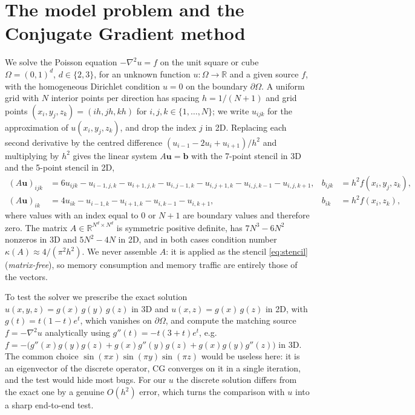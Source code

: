 \documentclass[10pt,a4paper]{article}
\newcommand{\vb}[1]{\mathbf{#1}}
\begin{document}
\section{The model problem and the Conjugate Gradient method}\label{sec:algorithm}

We solve the Poisson equation $-\nabla^2 u = f$ on the unit square or cube $\Omega=(0,1)^d$, $d\in\{2,3\}$,
for an unknown function $u:\Omega\to\mathbb{R}$ and a given source $f$, with the homogeneous Dirichlet
condition $u=0$ on the boundary $\partial\Omega$. A uniform grid with $N$ interior points per direction has
spacing $h=1/(N+1)$ and grid points $(x_i,y_j,z_k)=(ih,jh,kh)$ for $i,j,k\in\{1,\dots,N\}$; we write
$u_{ijk}$ for the approximation of $u(x_i,y_j,z_k)$, and drop the index $j$ in 2D. Replacing each second
derivative by the centred difference $(u_{i-1}-2u_i+u_{i+1})/h^2$ and multiplying by $h^2$ gives the linear
system $A\vb u=\vb b$ with the 7-point stencil in 3D and the 5-point stencil in 2D,
\begin{equation}\label{eq:stencil}
\begin{aligned}
  (A\vb u)_{ijk} &= 6u_{ijk}-u_{i-1,j,k}-u_{i+1,j,k}-u_{i,j-1,k}-u_{i,j+1,k}-u_{i,j,k-1}-u_{i,j,k+1},
  & b_{ijk} &= h^2 f(x_i,y_j,z_k), \\
  (A\vb u)_{ik} &= 4u_{ik}-u_{i-1,k}-u_{i+1,k}-u_{i,k-1}-u_{i,k+1},
  & b_{ik} &= h^2 f(x_i,z_k),
\end{aligned}
\end{equation}
where values with an index equal to $0$ or $N+1$ are boundary values and therefore zero. The matrix
$A\in\mathbb{R}^{N^d\times N^d}$ is symmetric positive definite, has $7N^3-6N^2$ nonzeros in 3D and
$5N^2-4N$ in 2D, and in both cases condition number $\kappa(A)\approx 4/(\pi^2h^2)$. We never assemble
$A$: it is applied as the stencil \eqref{eq:stencil} (\emph{matrix-free}), so memory consumption and
memory traffic are entirely those of the vectors.

To test the solver we prescribe the exact solution $u(x,y,z)=g(x)\,g(y)\,g(z)$ in 3D and $u(x,z)=g(x)\,g(z)$
in 2D, with $g(t)=t(1-t)e^{t}$, which vanishes on $\partial\Omega$, and compute the matching source
$f=-\nabla^2 u$ analytically using $g''(t)=-t(3+t)e^t$, e.g.\
$f=-\bigl(g''(x)g(y)g(z)+g(x)g''(y)g(z)+g(x)g(y)g''(z)\bigr)$ in 3D. The common choice $\sin(\pi x)\sin(\pi y)\sin(\pi z)$ would be useless here: it is
an eigenvector of the discrete operator, CG converges on it in a single iteration, and the test would
hide most bugs. For our $u$ the discrete solution differs from the exact one by a genuine $O(h^2)$ error,
which turns the comparison with $u$ into a sharp end-to-end test.
\end{document}
